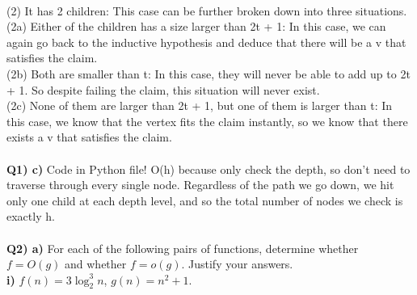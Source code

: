 \documentclass[11pt]{article}
\begin{document}
    \\ (2) It has 2 children: This case can be further broken down into three situations.
    \\ (2a) Either of the children has a size larger than 2t + 1: In this case, we can again go back to the inductive hypothesis and deduce that there will be a v that satisfies the claim.
    \\ (2b) Both are smaller than t: In this case, they will never be able to add up to 2t + 1. So despite failing the claim, this situation will never exist.
    \\ (2c) None of them are larger than 2t + 1, but one of them is larger than t: In this case, we know that the vertex fits the claim instantly, so we know that there exists a v that satisfies the claim.
    \\\\
    
\textbf{Q1) c)} Code in Python file! O(h) because only check the depth, so don't need to traverse through every single node. Regardless of the path we go down, we hit only one child at each depth level, and so the total number of nodes we check is exactly h.
\\\\
\textbf{Q2) a)} For each of the following pairs of functions, determine whether $f=O(g)$ and whether $f=o(g)$.  Justify your answers. \\
    
    \textbf{i)} $f(n) = 3\log_2^3 n$, $g(n) = n^2+1$.\\
\end{document}
